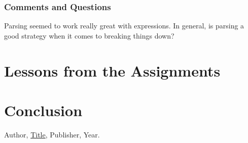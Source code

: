 \documentclass{article}
\theoremstyle{theorem}
\theoremstyle{definition}
\theoremstyle{remark}
\begin{document}
\subsubsection*{Comments and Questions}
Parsing seemed to work really great with expressions. In general, is parsing a good strategy when it comes to breaking things down?

\section{Lessons from the Assignments}


\section{Conclusion}\label{conclusion}


\begin{thebibliography}{99}
 Author, \href{https://en.wikipedia.org/wiki/LaTeX}{Title}, Publisher, Year.
\end{thebibliography}
\end{document}
